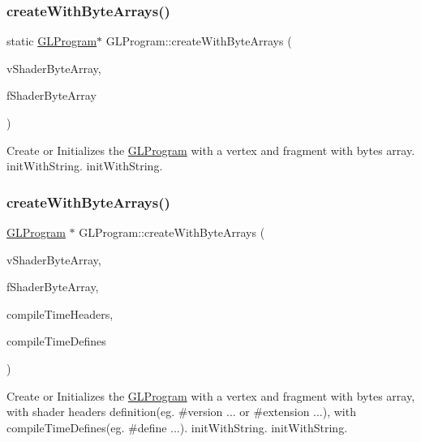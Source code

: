 \subsubsection{\texorpdfstring{create\+With\+Byte\+Arrays()}{createWithByteArrays()}\hspace{0.1cm}{\footnotesize\ttfamily [2/3]}}
{\footnotesize\ttfamily static \hyperlink{classGLProgram}{G\+L\+Program}$\ast$ G\+L\+Program\+::create\+With\+Byte\+Arrays (\begin{DoxyParamCaption}\item[{const G\+Lchar $\ast$}]{v\+Shader\+Byte\+Array,  }\item[{const G\+Lchar $\ast$}]{f\+Shader\+Byte\+Array }\end{DoxyParamCaption})\hspace{0.3cm}{\ttfamily [static]}}

Create or Initializes the \hyperlink{classGLProgram}{G\+L\+Program} with a vertex and fragment with bytes array.  init\+With\+String.  init\+With\+String. \mbox{\label{classGLProgram_a2558f4dd351b6cec829d939e5b31212b}} 
\subsubsection{\texorpdfstring{create\+With\+Byte\+Arrays()}{createWithByteArrays()}\hspace{0.1cm}{\footnotesize\ttfamily [3/3]}}
{\footnotesize\ttfamily \hyperlink{classGLProgram}{G\+L\+Program} $\ast$ G\+L\+Program\+::create\+With\+Byte\+Arrays (\begin{DoxyParamCaption}\item[{const G\+Lchar $\ast$}]{v\+Shader\+Byte\+Array,  }\item[{const G\+Lchar $\ast$}]{f\+Shader\+Byte\+Array,  }\item[{const std\+::string \&}]{compile\+Time\+Headers,  }\item[{const std\+::string \&}]{compile\+Time\+Defines }\end{DoxyParamCaption})\hspace{0.3cm}{\ttfamily [static]}}

Create or Initializes the \hyperlink{classGLProgram}{G\+L\+Program} with a vertex and fragment with bytes array, with shader headers definition(eg. \#version ... or \#extension ...), with compile\+Time\+Defines(eg. \#define ...).  init\+With\+String.  init\+With\+String. \mbox{\label{classGLProgram_a0e7f81b7ee96828bad102f57dd3cc309}} 
